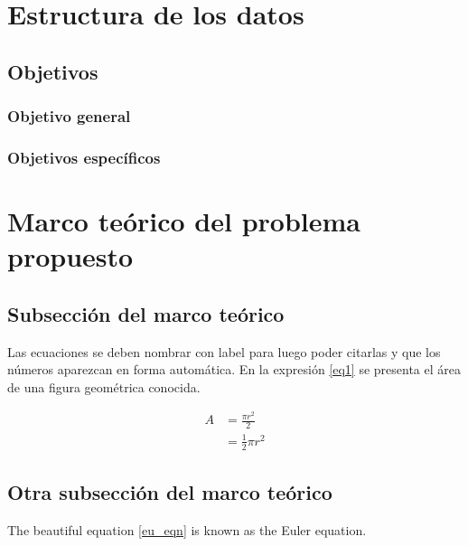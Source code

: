 \documentclass[12pt]{article}
\begin{document}
\section{Estructura de los datos}

\subsection{Objetivos}

\subsubsection{Objetivo general}

\subsubsection{Objetivos específicos}

\section{Marco teórico del problema propuesto}

\subsection{Subsección del marco teórico} %
Las ecuaciones se deben nombrar con label para luego poder citarlas y que los números aparezcan en forma automática. En la expresión \eqref{eq1} se presenta el área de una figura geométrica conocida.

\begin{equation} \label{eq1}
\begin{split}
A & = \frac{\pi r^2}{2} \\
& = \frac{1}{2} \pi r^2
\end{split}
\end{equation}

\subsection{Otra subsección del marco teórico} %
The beautiful equation \eqref{eu_eqn} is known as the Euler equation.
\end{document}

